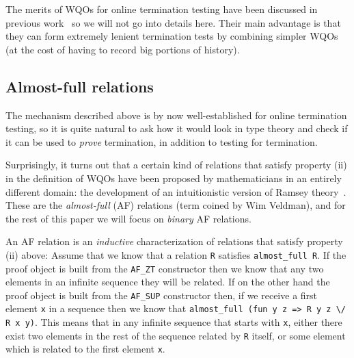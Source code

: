 \documentclass{llncs}
\begin{document}
The merits of WQOs for online termination testing have been discussed in
previous work~\cite{leuschel-wqos} so we will not go into 
details here. Their main advantage is that they can form extremely lenient termination 
tests by combining simpler WQOs (at the cost of having to record big portions of history).


\subsection{Almost-full relations}\label{ssect:af}

The mechanism described above is by now well-established for online termination 
testing, so it is quite natural to ask how it would look in type theory and check
if it can be used to {\em prove} termination, in addition to testing for termination.

Surprisingly, it turns out that a certain kind of relations that satisfy property (ii) in the 
definition of WQOs have been proposed by mathematicians in an entirely different 
domain: the development of an intuitionistic version of Ramsey 
theory~\cite{Veldman01041993}. These are the {\em almost-full} (AF) relations (term coined by Wim Veldman), 
and for the rest of this paper we will focus on {\em binary} AF relations.

An AF relation is an {\em inductive} characterization of relations that satisfy 
property (ii) above: 
Assume that we know that a relation \lstinline|R| satisfies 
\lstinline|almost_full R|. If the proof object is built from the 
\lstinline|AF_ZT| constructor then we know that any two elements in an infinite sequence they will be related. If on the other hand the proof object is
built from the \lstinline|AF_SUP| constructor then, if we receive a first
element \lstinline|x| in a sequence then we know that 
\lstinline|almost_full (fun y z => R y z \/ R x y)|. 
This means that in any infinite
sequence that starts with \lstinline|x|, either there exist two elements in the rest of the sequence related by \lstinline|R| itself, or
some element which is related to the first element \lstinline|x|.


\end{document}
